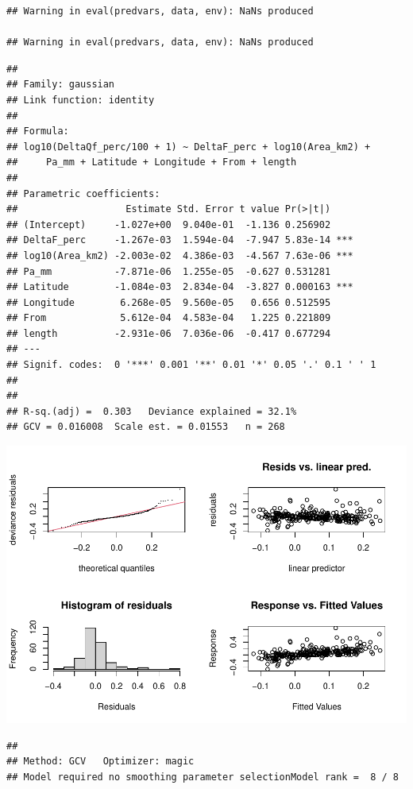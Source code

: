 \documentclass[]{elsarticle} %
\begin{document}
\begin{verbatim}
## Warning in eval(predvars, data, env): NaNs produced

## Warning in eval(predvars, data, env): NaNs produced
\end{verbatim}

\begin{verbatim}
## 
## Family: gaussian 
## Link function: identity 
## 
## Formula:
## log10(DeltaQf_perc/100 + 1) ~ DeltaF_perc + log10(Area_km2) + 
##     Pa_mm + Latitude + Longitude + From + length
## 
## Parametric coefficients:
##                   Estimate Std. Error t value Pr(>|t|)    
## (Intercept)     -1.027e+00  9.040e-01  -1.136 0.256902    
## DeltaF_perc     -1.267e-03  1.594e-04  -7.947 5.83e-14 ***
## log10(Area_km2) -2.003e-02  4.386e-03  -4.567 7.63e-06 ***
## Pa_mm           -7.871e-06  1.255e-05  -0.627 0.531281    
## Latitude        -1.084e-03  2.834e-04  -3.827 0.000163 ***
## Longitude        6.268e-05  9.560e-05   0.656 0.512595    
## From             5.612e-04  4.583e-04   1.225 0.221809    
## length          -2.931e-06  7.036e-06  -0.417 0.677294    
## ---
## Signif. codes:  0 '***' 0.001 '**' 0.01 '*' 0.05 '.' 0.1 ' ' 1
## 
## 
## R-sq.(adj) =  0.303   Deviance explained = 32.1%
## GCV = 0.016008  Scale est. = 0.01553   n = 268
\end{verbatim}

\includegraphics{Forest_and_Water_files/figure-latex/model2a1-1.pdf}

\begin{verbatim}
## 
## Method: GCV   Optimizer: magic
## Model required no smoothing parameter selectionModel rank =  8 / 8
\end{verbatim}
\end{document}
